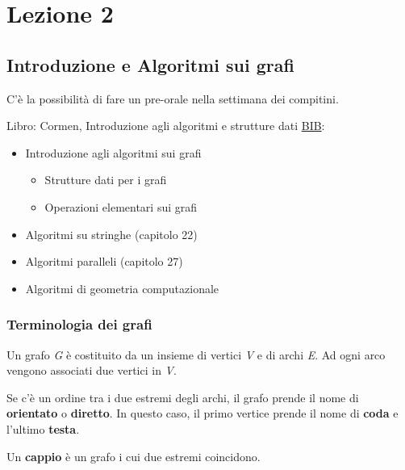 \chapter{Lezione 2}
\section{Introduzione e Algoritmi sui grafi}\label{lezione-2---introduzione-e-algoritmi-sui-grafi}

C'è la possibilità di fare un pre-orale nella settimana dei compitini.

Libro: Cormen, Introduzione agli algoritmi e strutture dati
\href{http://catalogo.unipd.it/F/FCKK1DACESL2TDH5CF15FLDL2BUM936U1XG9U15MFDCKI764BV-10675?func=full-set-set\&set_number=011139\&set_entry=000001\&format=999}{BIB}:

\begin{itemize}
\tightlist
\item
  Introduzione agli algoritmi sui grafi

  \begin{itemize}
  \tightlist
  \item
    Strutture dati per i grafi
  \item
    Operazioni elementari sui grafi
  \end{itemize}
\item
  Algoritmi su stringhe (capitolo 22)
\item
  Algoritmi paralleli (capitolo 27)
\item
  Algoritmi di geometria computazionale
\end{itemize}

\subsection{Terminologia dei grafi}\label{terminologia-dei-grafi}

Un grafo \emph{G} è costituito da un insieme di vertici \emph{V} e di
archi \emph{E}. Ad ogni arco vengono associati due vertici in \emph{V}.

Se c'è un ordine tra i due estremi degli archi, il grafo prende il nome
di \textbf{orientato} o \textbf{diretto}. In questo caso, il primo
vertice prende il nome di \textbf{coda} e l'ultimo \textbf{testa}.

Un \textbf{cappio} è un grafo i cui due estremi coincidono.

